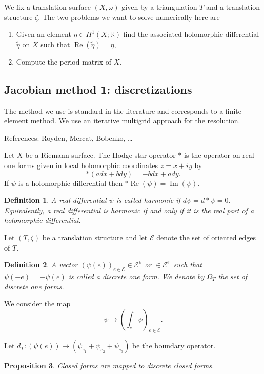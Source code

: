 \documentclass[a4paper,12pt]{article}
\def\bC{\mathbb{C}}
\def\bR{\mathbb{R}}
\def\cE{\mathcal{E}}
\def\Re{\operatorname{Re}}
\def\Im{\operatorname{Im}}
\newtheorem{definition}{Definition}
\newtheorem{proposition}[definition]{Proposition}
\begin{document}
We fix a translation surface $(X, \omega)$ given by a triangulation $T$ and a translation
structure $\zeta$. The two problems we want to solve numerically here are
\begin{enumerate}
\item Given an element $\eta \in H^1(X; \bR)$ find the associated holomorphic differential
$\tilde{\eta}$ on $X$ such that $\Re(\tilde{\eta}) = \eta$,
\item Compute the period matrix of $X$.
\end{enumerate}

\subsection{Jacobian method 1: discretizations}
The method we use is standard in the literature and corresponds to a finite element
method. We use an iterative multigrid approach for the resolution.

References: Royden, Mercat, Bobenko, \ldots


Let $X$ be a Riemann surface. The Hodge star operator $*$ is the operator on 
real one forms given in local holomorphic coordinates $z = x+iy$ by
\[
*(a dx + b dy) = -b dx + a dy.
\]
If $\psi$ is a holomorphic differential then $* \Re(\psi) = \Im(\psi)$.

\begin{definition}
A real differential $\psi$ is called \emph{harmonic} if $d \psi = d*\psi = 0$.
Equivalently, a real differential is harmonic if and only if it is the real
part of a holomorphic differential.
\end{definition}

Let $(T, \zeta)$ be a translation structure and let $\cE$ denote the set of
oriented edges of $T$. 

\begin{definition}
A vector $(\psi(e))_{e \in \cE} \in \cE^\bR$ or $\in \cE^\bC$ such that
$\psi(-e) = -\psi(e)$ is called a \emph{discrete one form}. We denote
by $\Omega_T$ the set of discrete one forms.
\end{definition}

We consider the map
\begin{equation}
\label{eq:discretization}
\psi \mapsto (\int_e \psi)_{e \in \cE}.
\end{equation}

Let $d_T: (\psi(e)) \mapsto (\psi_{e_1} + \psi_{e_2} + \psi_{e_3})$ be the boundary
operator.

\begin{proposition}
Closed forms are mapped to discrete closed forms.
\end{proposition}
\end{document}
